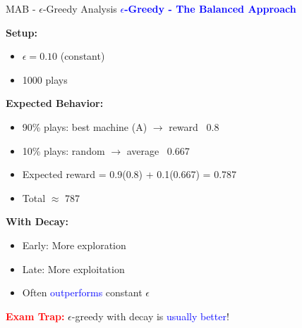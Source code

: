 \documentclass[8pt]{beamer}
\begin{document}
	\begin{frame}{MAB - $\epsilon$-Greedy Analysis}
		\fontsize{6.5}{7.5}\selectfont
		\textcolor{blue}{\textbf{$\epsilon$-Greedy - The Balanced Approach}}
		
		\textbf{Setup:}
		\begin{itemize}
			\item $\epsilon = 0.10$ (constant)
			\item 1000 plays
		\end{itemize}
		
		\textbf{Expected Behavior:}
		\begin{itemize}
			\item 90\% plays: best machine (A) $\rightarrow$ reward ~0.8
			\item 10\% plays: random $\rightarrow$ average ~0.667
			\item Expected reward = 0.9(0.8) + 0.1(0.667) = 0.787
			\item Total $\approx$ 787
		\end{itemize}
		
		\textbf{With Decay:}
		\begin{itemize}
			\item Early: More exploration
			\item Late: More exploitation
			\item Often \textcolor{blue}{outperforms} constant $\epsilon$
		\end{itemize}
		
		\textcolor{red}{\textbf{Exam Trap:}} $\epsilon$-greedy with decay is \textcolor{blue}{usually better}!
	\end{frame}
	
\end{document}
